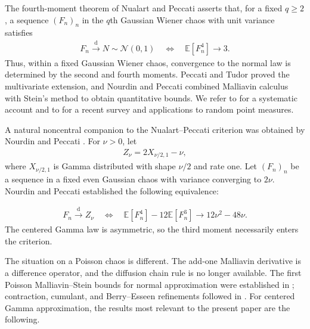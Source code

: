 \documentclass[letterpaper,11pt,reqno]{amsart}
\numberwithin{equation}{section}
\theoremstyle{plain}
\theoremstyle{definition}
\theoremstyle{remark}
\newcommand{\E}{\mathbb{E}}
\newcommand{\NN}{\mathcal{N}}
\newcommand{\noi}{\noindent}
\begin{document}
The fourth-moment theorem of Nualart and Peccati \cite{NP05}
asserts that, for a fixed $q\geq2$, a sequence $(F_n)_n$ in the $q$th
Gaussian Wiener chaos with unit variance satisfies
\noi
\begin{align*}
 F_n\xrightarrow{\mathrm d}N\sim\NN(0,1)
 \quad\Longleftrightarrow\quad
 \E[F_n^4]\longrightarrow3.
\end{align*}
Thus, within a fixed Gaussian Wiener chaos, 
convergence to the normal law is determined by the second and fourth moments.
Peccati and Tudor \cite{PT05} proved the multivariate extension, and
Nourdin and Peccati \cite{NP09a} combined Malliavin calculus with
Stein's method to obtain quantitative bounds.  We refer to
\cite{NP12} for a systematic account and to \cite{APY21} for a recent
survey and applications to random point measures.

A natural noncentral companion to the Nualart--Peccati criterion
was obtained by Nourdin and Peccati
\cite{NP09b}.  For $\nu>0$, let
\noi
\begin{align}
 Z_\nu=2X_{\nu/2,1}-\nu,
 \label{def_Znu}
\end{align}
where $X_{\nu/2,1}$ is Gamma distributed with
shape $\nu/2$ and rate one.
Let $(F_n)_n$ be a sequence in a fixed even Gaussian chaos with
variance converging to $2\nu$.  Nourdin and Peccati established the
following equivalence:

\noi
\begin{align}
  F_n\xrightarrow{\mathrm d} Z_\nu
 \quad\Longleftrightarrow\quad
 \E[F_n^4]-12\E[F_n^3]
 \longrightarrow12\nu^2-48\nu.
 \label{NP_Gam}
\end{align}
The centered Gamma law is asymmetric, so the third moment necessarily
enters the criterion.


The situation on a Poisson chaos is different.  The add-one
Malliavin derivative is a difference operator, and the diffusion chain
rule is no longer available.  The first Poisson Malliavin--Stein bounds
for normal approximation were established in \cite{PSTU10,PZ10};
contraction, cumulant, and Berry--Esseen refinements followed in
\cite{LRP13,ET14,PZ14}.  For centered Gamma approximation, the results
most relevant to the present paper are the following.
\end{document}
